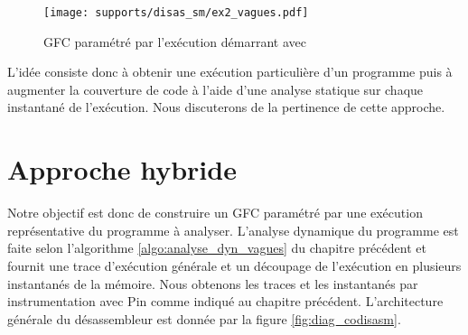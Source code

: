 
\begin{figure}[h]
\begin{center}
  \texttt{[image: supports/disas\_sm/ex2\_vagues.pdf]}
\end{center}
\caption{GFC paramétré par l'exécution démarrant avec }
\label{fig:sm_cfg_vagues}
\end{figure}


L'idée consiste donc à obtenir une exécution particulière d'un programme puis à augmenter la couverture de code à l'aide d'une analyse statique sur chaque instantané de l'exécution. Nous discuterons de la pertinence de cette approche.


\FloatBarrier
\section{Approche hybride}

Notre objectif est donc de construire un GFC paramétré par une exécution représentative du programme à analyser.
L'analyse dynamique du programme est faite selon l'algorithme \ref{algo:analyse_dyn_vagues} du chapitre précédent et fournit une trace d'exécution générale et un découpage de l'exécution en plusieurs instantanés de la mémoire.
Nous obtenons les traces et les instantanés par instrumentation avec Pin comme indiqué au chapitre précédent.
L'architecture générale du désassembleur est donnée par la figure \ref{fig:diag_codisasm}.

